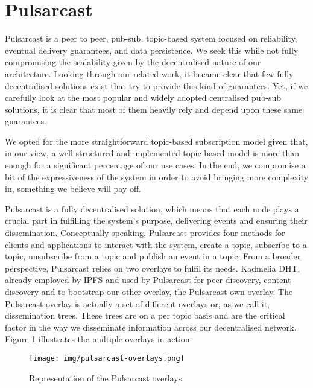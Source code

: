 
\section{Pulsarcast}
\label{section:pulsarcast}

Pulsarcast is a peer to peer, pub-sub, topic-based system focused on
reliability, eventual delivery guarantees, and data persistence. We seek this
while not fully compromising the scalability given by the decentralised nature
of our architecture. Looking through our related work, it became clear that few
fully decentralised solutions exist that try to provide this kind of
guarantees. Yet, if we carefully look at the most popular and widely adopted
centralised pub-sub solutions, it is clear that most of them heavily rely and
depend upon these same guarantees. 

We opted for the more straightforward topic-based subscription model given
that, in our view, a well structured and implemented topic-based model is more
than enough for a significant percentage of our use cases. In the end, we
compromise a bit of the expressiveness of the system in order to avoid bringing
more complexity in, something we believe will pay off.

Pulsarcast is a fully decentralised solution, which means that each node plays
a crucial part in fulfilling the system's purpose, delivering events and
ensuring their dissemination. Conceptually speaking, Pulsarcast provides four
methods for clients and applications to interact with the system, create a
topic, subscribe to a topic, unsubscribe from a topic and publish an event in a
topic. From a broader perspective, Pulsarcast relies on two overlays to fulfil
its needs. Kadmelia DHT, already employed by IPFS and used by
Pulsarcast for peer discovery, content discovery and to bootstrap our other
overlay, the Pulsarcast own overlay. The Pulsarcast overlay is actually a set of
different overlays or, as we call it, dissemination trees.  These trees are on
a per topic basis and are the critical factor in the way we disseminate
information across our decentralised network.  Figure
\ref{fig:pulsarcast-overlays} illustrates the multiple overlays in action.

\begin{figure}[hb!]
  \centering
  \texttt{[image: img/pulsarcast-overlays.png]}
  \caption{Representation of the Pulsarcast overlays}
  \label{fig:pulsarcast-overlays}
\end{figure}

